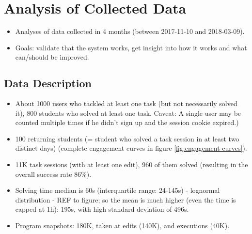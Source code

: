 \chapter{Analysis of Collected Data}
\label{chap:analysis}

\begin{itemize}
\item Analyses of data collected in 4 months (between 2017-11-10 and 2018-03-09).
\item Goals: validate that the system works, get insight into how it works
  and what can/should be improved.
\end{itemize}


\section{Data Description}

\begin{itemize}
\item About 1000 users who tackled at least one task (but not necessarily solved
  it), 800 students who solved at least one task. Caveat: A single user may be
  counted multiple times if he didn't sign up and the session cookie expired.)
\item 100 returning students (= student who solved a task session in at
  least two distinct days)
  (complete engagement curves in figure \ref{fig:engagement-curves}).
\item 11K task sessions (with at least one edit), 960 of them solved
  (resulting in the overall success rate $86 \%$).
\item Solving time median is 60s (interquartile range: 24-145s) - lognormal
  distribution - REF to figure; so the mean is much higher (even the time is
  capped at 1h): 195s, with high standard deviation of 496s.
\item Program snapshots: 180K, taken at edits (140K), and executions (40K).
\end{itemize}




